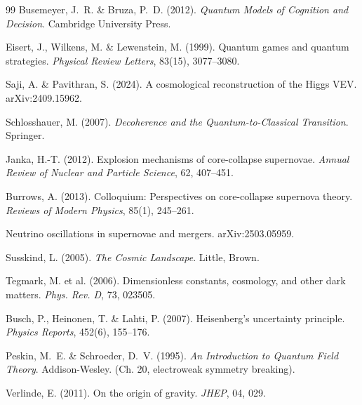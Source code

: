 \documentclass[12pt,a4paper]{article}
\theoremstyle{remark}
\begin{document}
\begin{thebibliography}{99}
Busemeyer, J.~R. \& Bruza, P.~D. (2012).
\newblock \textit{Quantum Models of Cognition and Decision}.
\newblock Cambridge University Press.

Eisert, J., Wilkens, M. \& Lewenstein, M. (1999).
\newblock Quantum games and quantum strategies.
\newblock \textit{Physical Review Letters}, 83(15), 3077--3080.

Saji, A. \& Pavithran, S. (2024).
\newblock A cosmological reconstruction of the Higgs VEV.
\newblock arXiv:2409.15962.

Schlosshauer, M. (2007).
\newblock \textit{Decoherence and the Quantum-to-Classical Transition}.
\newblock Springer.

Janka, H.-T. (2012).
\newblock Explosion mechanisms of core-collapse supernovae.
\newblock \textit{Annual Review of Nuclear and Particle Science}, 62, 407--451.

Burrows, A. (2013).
\newblock Colloquium: Perspectives on core-collapse supernova theory.
\newblock \textit{Reviews of Modern Physics}, 85(1), 245--261.

Neutrino oscillations in supernovae and mergers.
\newblock arXiv:2503.05959.

Susskind, L. (2005).
\newblock \textit{The Cosmic Landscape}.
\newblock Little, Brown.

Tegmark, M. et al. (2006).
\newblock Dimensionless constants, cosmology, and other dark matters.
\newblock \textit{Phys. Rev. D}, 73, 023505.

Busch, P., Heinonen, T. \& Lahti, P. (2007).
\newblock Heisenberg's uncertainty principle.
\newblock \textit{Physics Reports}, 452(6), 155--176.

Peskin, M.~E. \& Schroeder, D.~V. (1995).
\newblock \textit{An Introduction to Quantum Field Theory}.
\newblock Addison-Wesley. (Ch. 20, electroweak symmetry breaking).

Verlinde, E. (2011).
\newblock On the origin of gravity.
\newblock \textit{JHEP}, 04, 029.


\end{thebibliography}
\end{document}
